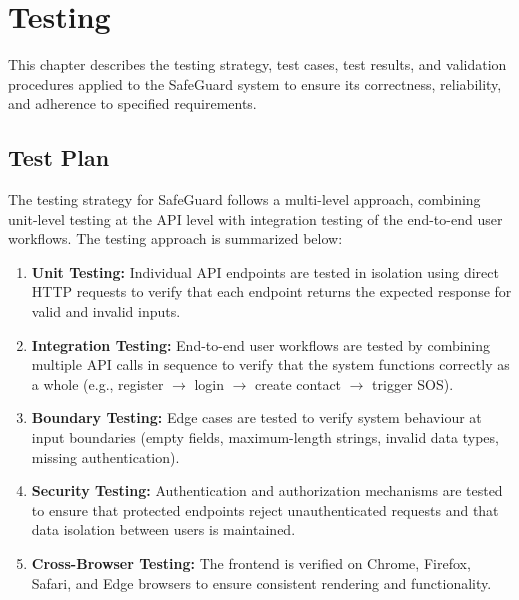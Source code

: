 \chapter{Testing}

This chapter describes the testing strategy, test cases, test results, and validation procedures applied to the SafeGuard system to ensure its correctness, reliability, and adherence to specified requirements.

\section{Test Plan}

The testing strategy for SafeGuard follows a multi-level approach, combining unit-level testing at the API level with integration testing of the end-to-end user workflows. The testing approach is summarized below:

\begin{enumerate}[label=\textbf{T\arabic*.}]
  \item \textbf{Unit Testing:} Individual API endpoints are tested in isolation using direct HTTP requests to verify that each endpoint returns the expected response for valid and invalid inputs.

  \item \textbf{Integration Testing:} End-to-end user workflows are tested by combining multiple API calls in sequence to verify that the system functions correctly as a whole (e.g., register $\to$ login $\to$ create contact $\to$ trigger SOS).

  \item \textbf{Boundary Testing:} Edge cases are tested to verify system behaviour at input boundaries (empty fields, maximum-length strings, invalid data types, missing authentication).

  \item \textbf{Security Testing:} Authentication and authorization mechanisms are tested to ensure that protected endpoints reject unauthenticated requests and that data isolation between users is maintained.

  \item \textbf{Cross-Browser Testing:} The frontend is verified on Chrome, Firefox, Safari, and Edge browsers to ensure consistent rendering and functionality.
\end{enumerate}

